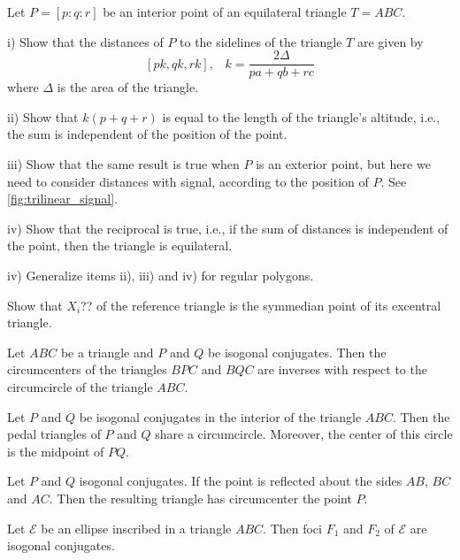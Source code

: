 \begin{exercise}\label{ex:1chap1}
Let $P=[p:q:r] $ be an interior point of an equilateral triangle $T=ABC$.

\noindent i) Show that the distances of $P$ to the sidelines of the triangle $T$ are given by
\[ [pk,qk,rk], \;\;\;k=\frac{2\Delta}{pa+qb+rc}\]
where $\Delta$ is the area of the triangle.

 \noindent ii)
 Show that  $k(p+q+r)$ is equal to the length of the triangle's altitude, i.e., the sum is independent of the position of the point.
 
 \noindent iii) Show that the same result is true when $P$ is an exterior point, but here we need to consider distances with signal, according to the position of $P$. See \cref{fig:trilinear_signal}.
 
 \noindent iv) Show that the reciprocal is true, i.e., if the sum of distances is independent of the point, then the triangle is equilateral.
 
 \noindent iv) Generalize items ii), iii) and iv)  for regular polygons.
 \end{exercise}
 
 \begin{exercise}\label{ex:2chap1} Show that $X_i$??  of the reference triangle    is the symmedian point of its excentral triangle.
 
  \end{exercise}
 
  \begin{exercise}\label{ex:3appA}
 Let $ABC$ be a  triangle and    $P$ and $Q$ be isogonal conjugates.  Then the circumcenters of the triangles $BPC$ and $BQC$ are inverses with respect to the circumcircle of the triangle $ABC$.
   \end{exercise}
  
   \begin{exercise}\label{ex:4appA}
   Let $P$ and $Q$ be isogonal conjugates in the interior of
the triangle $ABC$. Then the   pedal  triangles of $P$ and $Q$
 share a circumcircle. Moreover, the center of this circle is the midpoint
of $PQ$.
    \end{exercise}
   
      \begin{exercise}\label{ex:5app}
  Let $P $ and $Q$ isogonal conjugates.  If the point
is reflected about the sides
$AB$, $BC$ and $AC$.
  Then the resulting triangle has circumcenter the point $P$.
 
    \end{exercise}  \begin{exercise}\label{ex:6app}
  Let $\mathcal{E}$ be an ellipse inscribed in a triangle $ABC$. Then foci $F_1$ and $F_2$ of $\mathcal{E}$ are isogonal conjugates. 
 
    \end{exercise}